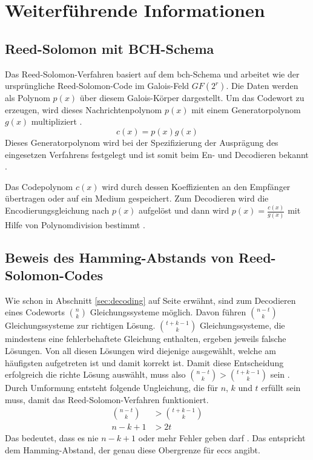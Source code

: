 \chapter{Weiterführende Informationen}\label{app:supplemental-information}

\section{Reed-Solomon mit BCH-Schema}\label{app:bch-rs}

Das Reed-Solomon-Verfahren basiert auf dem \acrfull{bch}-Schema und arbeitet wie der ursprüngliche Reed-Solomon-Code im Galois-Feld $GF(2^r)$.
Die Daten werden als Polynom $p(x)$ über diesem Galois-Körper dargestellt. 
Um das Codewort zu erzeugen, wird dieses Nachrichtenpolynom $p(x)$ mit einem Generatorpolynom $g(x)$ multipliziert \cite{stoneMultipleBurstErrorCorrection1963}.
\[
c(x)=p(x)g(x)
\]
Dieses Generatorpolynom wird bei der Spezifizierung der Ausprägung des eingesetzen Verfahrens festgelegt und ist somit beim En- und Decodieren bekannt \cite{deepak2018WhatReedSolomon2022}.

Das Codepolynom $c(x)$ wird durch dessen Koeffizienten an den Empfänger übertragen oder auf ein Medium gespeichert.
Zum Decodieren wird die Encodierungsgleichung nach $p(x)$ aufgelöst und dann wird $p(x)=\frac{c(x)}{g(x)}$ mit Hilfe von Polynomdivision bestimmt \cite{geiselTutorialReedSolomonError1990}.

\section{Beweis des Hamming-Abstands von Reed-Solomon-Codes}\label{app:hammingDistanceRS}

Wie schon in Abschnitt \ref{sec:decoding} auf Seite \pageref{sec:decoding} erwähnt, sind zum Decodieren eines Codeworts $\binom{n}{k}$ Gleichungssysteme möglich.
Davon führen $\binom{n-t}{k}$ Gleichungssysteme zur richtigen Lösung.
$\binom{t+k-1}{k}$ Gleichungssysteme, die mindestens eine fehlerbehaftete Gleichung enthalten, ergeben jeweils falsche Lösungen.
Von all diesen Lösungen wird diejenige ausgewählt, welche am häufigsten aufgetreten ist und damit korrekt ist.
Damit diese Entscheidung erfolgreich die richte Lösung auswählt, muss also $\binom{n-t}{k} > \binom{t+k-1}{k}$ sein \cite{reedPolynomialCodesCertain1960}.
Durch Umformung entsteht folgende Ungleichung, die für $n$, $k$ und $t$ erfüllt sein muss, damit das Reed-Solomon-Verfahren funktioniert.
\begin{align}
\binom{n-t}{k} &> \binom{t+k-1}{k} \nonumber\\
n-k+1 &> 2t \nonumber
\end{align}
Das bedeutet, dass es nie $n-k+1$ oder mehr Fehler geben darf \cite{reedPolynomialCodesCertain1960}.
Das entspricht dem Hamming-Abstand, der genau diese Obergrenze für \acrshort{ecc}s angibt.

